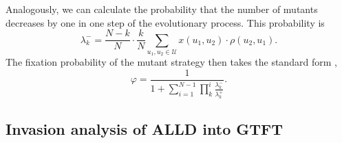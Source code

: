 \documentclass[11pt]{article}
\theoremstyle{plainCl1}
\theoremstyle{plainCl2}
\begin{document}
Analogously, we can calculate the probability that the number of mutants decreases by one in one step of the evolutionary process. This probability is
\begin{equation}
\lambda^-_k=\frac{N\!-\!k}{N}\cdot\frac{k}{N} \sum_{u_1,u_2\in\mathcal{U}} x(u_1,u_2)\cdot \rho(u_2,u_1).
\end{equation}
The fixation probability of the mutant strategy then takes the standard form \cite{nowak:Nature:2004},
\begin{equation}
\varphi = \frac{1}{1+\sum_{i=1}^{N-1}\prod_k^i \frac{\lambda^-_k}{\lambda^+_k}}.
\end{equation}


\subsection{Invasion analysis of ALLD into GTFT}
\end{document}
